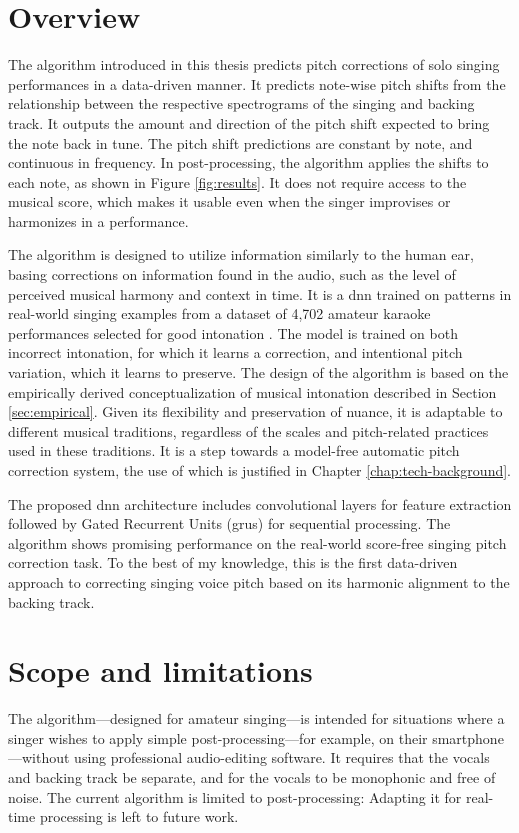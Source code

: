 \section{Overview}
The algorithm introduced in this thesis predicts pitch corrections of solo singing performances in a data-driven manner. It predicts note-wise pitch shifts from the relationship between the respective spectrograms of the singing and backing track. It outputs the amount and direction of the pitch shift expected to bring the note back in tune. The pitch shift predictions are constant by note, and continuous in frequency. In post-processing, the algorithm applies the shifts to each note, as shown in Figure \ref{fig:results}. It does not require access to the musical score, which makes it usable even when the singer improvises or harmonizes in a performance.

The algorithm is designed to utilize information similarly to the human ear, basing corrections on information found in the audio, such as the level of perceived musical harmony and context in time. It is a \gls{dnn} trained on patterns in real-world singing examples from a dataset of 4,702 amateur karaoke performances selected for good intonation \cite{wager2018intonation}. The model is trained on both incorrect intonation, for which it learns a correction, and intentional pitch variation, which it learns to preserve. The design of the algorithm is based on the empirically derived conceptualization of musical intonation described in Section \ref{sec:empirical}. Given its flexibility and preservation of nuance, it is adaptable to different musical traditions, regardless of the scales and pitch-related practices used in these traditions. It is a step towards a model-free automatic pitch correction system, the use of which is justified in Chapter \ref{chap:tech-background}. 

The proposed \gls{dnn} architecture includes convolutional layers for feature extraction followed by Gated Recurrent Units (\gls{gru}s) for sequential processing. The algorithm shows promising performance on the real-world score-free singing pitch correction task. To the best of my knowledge, this is the first data-driven approach to correcting singing voice pitch based on its harmonic alignment to the backing track.

\section{Scope and limitations}
The algorithm---designed for amateur singing---is intended for situations where a singer wishes to apply simple post-processing---for example, on their smartphone---without using professional audio-editing software. It requires that the vocals and backing track be separate, and for the vocals to be monophonic and free of noise. The current algorithm is limited to post-processing: Adapting it for real-time processing is left to future work.

